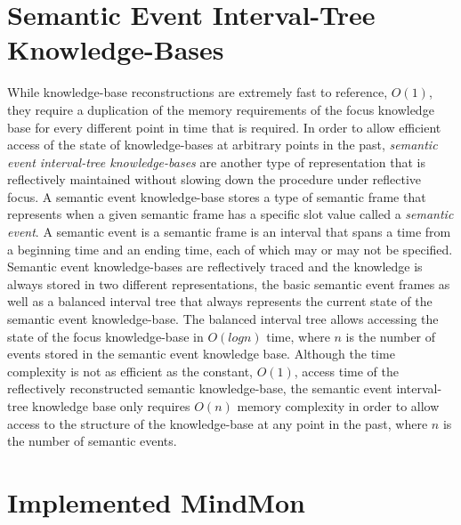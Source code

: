 \section{Semantic Event Interval-Tree Knowledge-Bases}

While knowledge-base reconstructions are extremely fast to reference,
$O(1)$, they require a duplication of the memory requirements of the
focus knowledge base for every different point in time that is
required.  In order to allow efficient access of the state of
knowledge-bases at arbitrary points in the past, \emph{semantic event
  interval-tree knowledge-bases} are another type of representation
that is reflectively maintained without slowing down the procedure
under reflective focus.  A semantic event knowledge-base stores a type
of semantic frame that represents when a given semantic frame has a
specific slot value called a \emph{semantic event}.  A semantic event
is a semantic frame is an interval that spans a time from a beginning
time and an ending time, each of which may or may not be specified.
Semantic event knowledge-bases are reflectively traced and the
knowledge is always stored in two different representations, the basic
semantic event frames as well as a balanced interval tree that always
represents the current state of the semantic event knowledge-base.
The balanced interval tree allows accessing the state of the focus
knowledge-base in $O(log n)$ time, where $n$ is the number of events
stored in the semantic event knowledge base.  Although the time
complexity is not as efficient as the constant, $O(1)$, access time of
the reflectively reconstructed semantic knowledge-base, the semantic
event interval-tree knowledge base only requires $O(n)$ memory
complexity in order to allow access to the structure of the
knowledge-base at any point in the past, where $n$ is the number of
semantic events.

\section{Implemented MindMon}

